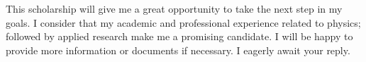 \documentclass[11pt,a4paper,roman]{moderncv}        %
\begin{document}
This scholarship will give me a great opportunity to take the next step in my goals. I consider that my academic and professional experience related to physics; followed by applied research make me a promising candidate. I will be happy to provide more information or documents if necessary. I eagerly await your reply.



\vspace{0.5cm}


\makeletterclosing
\end{document}
